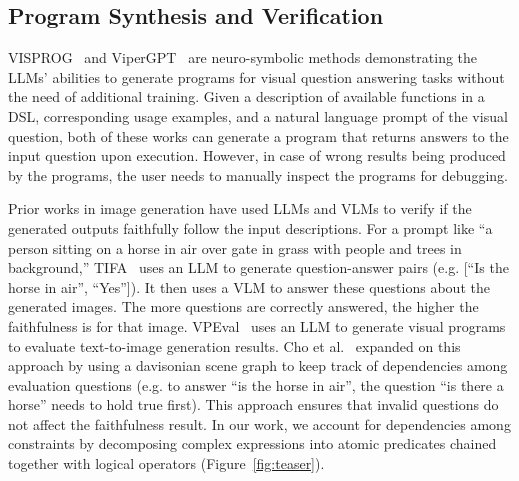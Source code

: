 \subsection{Program Synthesis and Verification}
VISPROG~\cite{gupta2023visprog} and ViperGPT~\cite{surismenon2023vipergpt} are neuro-symbolic methods demonstrating the LLMs' abilities to generate programs for visual question answering tasks without the need of additional training.
Given a description of available functions in a DSL, corresponding usage examples, and a natural language prompt of the visual question, both of these works can generate a program that returns answers to the input question upon execution.
However, in case of wrong results being produced by the programs, the user needs to manually inspect the programs for debugging.

Prior works in image generation have used LLMs and VLMs to verify if the generated outputs faithfully follow the input descriptions.
For a prompt like ``a person sitting on a horse in air over gate in grass with people and trees in background,'' TIFA~\cite{hu2023tifa} uses an LLM to generate question-answer pairs (e.g. [``Is the horse in air'', ``Yes'']).
It then uses a VLM to answer these questions about the generated images.
The more questions are correctly answered, the higher the faithfulness is for that image. 
VPEval~\cite{cho2023vpt2i} uses an LLM to generate visual programs to evaluate text-to-image generation results.
Cho et al.~ expanded on this approach by using a davisonian scene graph to keep track of dependencies among evaluation questions (e.g. to answer ``is the horse in air'', the question ``is there a horse'' needs to hold true first). 
This approach ensures that invalid questions do not affect the faithfulness result. 
In our work, we account for dependencies among constraints by decomposing complex expressions into atomic predicates chained together with logical operators (Figure~\ref{fig:teaser}).


